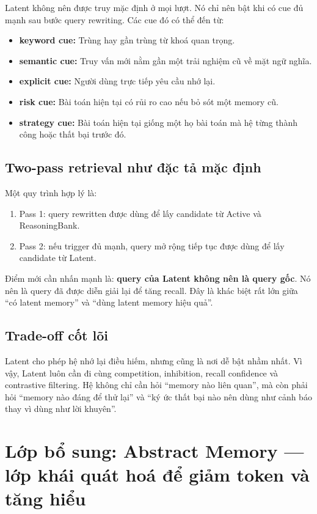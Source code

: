 \documentclass[a4paper,12pt]{article}
\begin{document}
Latent không nên được truy mặc định ở mọi lượt. Nó chỉ nên bật khi có cue đủ mạnh sau bước query rewriting. Các cue đó có thể đến từ:
\begin{itemize}
    \item \textbf{keyword cue:} Trùng hay gần trùng từ khoá quan trọng.
    \item \textbf{semantic cue:} Truy vấn mới nằm gần một trải nghiệm cũ về mặt ngữ nghĩa.
    \item \textbf{explicit cue:} Người dùng trực tiếp yêu cầu nhớ lại.
    \item \textbf{risk cue:} Bài toán hiện tại có rủi ro cao nếu bỏ sót một memory cũ.
    \item \textbf{strategy cue:} Bài toán hiện tại giống một họ bài toán mà hệ từng thành công hoặc thất bại trước đó.
\end{itemize}

\subsection*{Two-pass retrieval như đặc tả mặc định}

Một quy trình hợp lý là:
\begin{enumerate}
    \item Pass 1: query rewritten được dùng để lấy candidate từ Active và ReasoningBank.
    \item Pass 2: nếu trigger đủ mạnh, query mở rộng tiếp tục được dùng để lấy candidate từ Latent.
\end{enumerate}

Điểm mới cần nhấn mạnh là: \textbf{query của Latent không nên là query gốc}. Nó nên là query đã được diễn giải lại để tăng recall. Đây là khác biệt rất lớn giữa ``có latent memory'' và ``dùng latent memory hiệu quả''.

\subsection*{Trade-off cốt lõi}

Latent cho phép hệ nhớ lại điều hiếm, nhưng cũng là nơi dễ bật nhầm nhất. Vì vậy, Latent luôn cần đi cùng competition, inhibition, recall confidence và contrastive filtering. Hệ không chỉ cần hỏi ``memory nào liên quan'', mà còn phải hỏi ``memory nào đáng để thử lại'' và ``ký ức thất bại nào nên dùng như cảnh báo thay vì dùng như lời khuyên''.

\section{Lớp bổ sung: Abstract Memory --- lớp khái quát hoá để giảm token và tăng hiểu}
\end{document}
